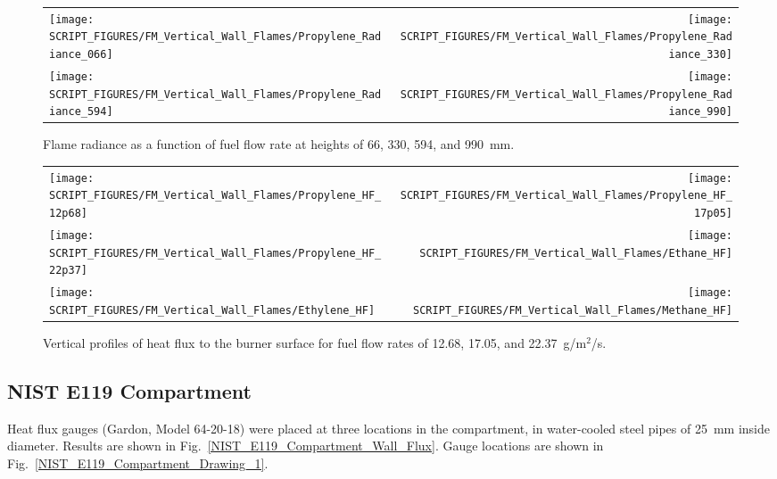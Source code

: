 \begin{figure}[h!]
\begin{tabular*}{\textwidth}{l@{\extracolsep{\fill}}r}
\texttt{[image: SCRIPT\_FIGURES/FM\_Vertical\_Wall\_Flames/Propylene\_Radiance\_066]} &
\texttt{[image: SCRIPT\_FIGURES/FM\_Vertical\_Wall\_Flames/Propylene\_Radiance\_330]} \\
\texttt{[image: SCRIPT\_FIGURES/FM\_Vertical\_Wall\_Flames/Propylene\_Radiance\_594]} &
\texttt{[image: SCRIPT\_FIGURES/FM\_Vertical\_Wall\_Flames/Propylene\_Radiance\_990]}
\end{tabular*}
\caption[FM Vertical Wall Flame experiments, flame radiance]
{Flame radiance as a function of fuel flow rate at heights of 66, 330, 594, and 990~mm.}
\label{FM_Vertical_Flame_Radiance}
\end{figure}

\newpage

\begin{figure}[p]
\begin{tabular*}{\textwidth}{l@{\extracolsep{\fill}}r}
\texttt{[image: SCRIPT\_FIGURES/FM\_Vertical\_Wall\_Flames/Propylene\_HF\_12p68]} &
\texttt{[image: SCRIPT\_FIGURES/FM\_Vertical\_Wall\_Flames/Propylene\_HF\_17p05]} \\
\texttt{[image: SCRIPT\_FIGURES/FM\_Vertical\_Wall\_Flames/Propylene\_HF\_22p37]} &
\texttt{[image: SCRIPT\_FIGURES/FM\_Vertical\_Wall\_Flames/Ethane\_HF]} \\
\texttt{[image: SCRIPT\_FIGURES/FM\_Vertical\_Wall\_Flames/Ethylene\_HF]} &
\texttt{[image: SCRIPT\_FIGURES/FM\_Vertical\_Wall\_Flames/Methane\_HF]}
\end{tabular*}
\caption[FM Vertical Wall Flame experiments, centerline heat flux]
{Vertical profiles of heat flux to the burner surface for fuel flow rates of 12.68, 17.05, and 22.37~g/m$^2$/s.}
\label{FM_Vertical_Flame_HF}
\end{figure}

\clearpage

\subsection{NIST E119 Compartment}

Heat flux gauges (Gardon, Model 64-20-18) were placed at three locations in the compartment, in water-cooled steel pipes of 25~mm inside diameter. Results are shown in Fig.~\ref{NIST_E119_Compartment_Wall_Flux}. Gauge locations are shown in Fig.~\ref{NIST_E119_Compartment_Drawing_1}.

